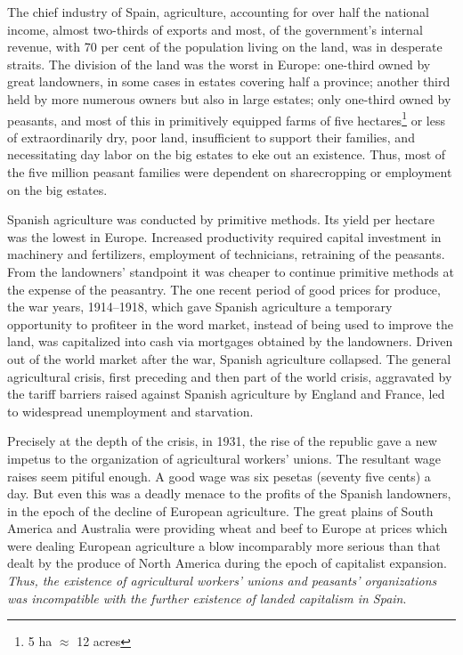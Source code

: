 The chief industry of Spain, agriculture, accounting for over half the national income, almost two-thirds of exports and most, of the government’s internal revenue, with 70 per cent of the population living on the land, was in desperate straits. The division of the land was the worst in Europe: one-third owned by great landowners, in some cases in estates covering half a province; another third held by more numerous owners but also in large estates; only one-third owned by peasants, and most of this in primitively equipped farms of five hectares\footnote{5 ha \( \approx \) 12 acres} or less of extraordinarily dry, poor land, insufficient to support their families, and necessitating day labor on the big estates to eke out an existence. Thus, most of the five million peasant families were dependent on sharecropping or employment on the big estates.

Spanish agriculture was conducted by primitive methods. Its yield per hectare was the lowest in Europe. Increased productivity required capital investment in machinery and fertilizers, employment of technicians, retraining of the peasants. From the landowners’ standpoint it was cheaper to continue primitive methods at the expense of the peasantry. The one recent period of good prices for produce, the war years, 1914--1918, which gave Spanish agriculture a temporary opportunity to profiteer in the word market, instead of being used to improve the land, was capitalized into cash via mortgages obtained by the landowners. Driven out of the world market after the war, Spanish agriculture collapsed. The general agricultural crisis, first preceding and then part of the world crisis, aggravated by the tariff barriers raised against Spanish agriculture by England and France, led to widespread unemployment and starvation.

Precisely at the depth of the crisis, in 1931, the rise of the republic gave a new impetus to the organization of agricultural workers’ unions. The resultant wage raises seem pitiful enough. A good wage was six pesetas (seventy five cents) a day. But even this was a deadly menace to the profits of the Spanish landowners, in the epoch of the decline of European agriculture. The great plains of South America and Australia were providing wheat and beef to Europe at prices which were dealing European agriculture a blow incomparably more serious than that dealt by the produce of North America during the epoch of capitalist expansion. \emph{Thus, the existence of agricultural workers’ unions and peasants’ organizations was incompatible with the further existence of landed capitalism in Spain}.

